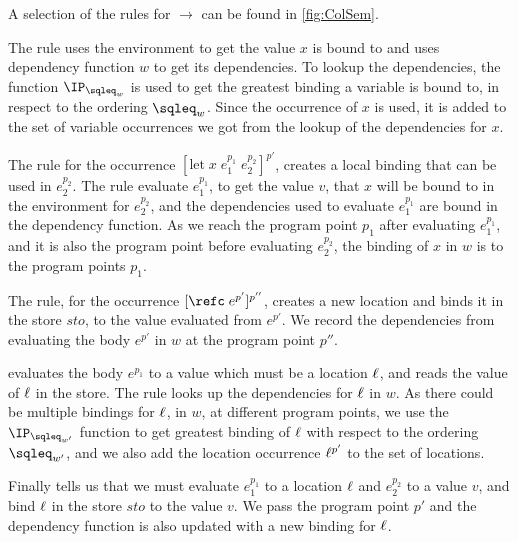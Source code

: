 \documentclass{eptcs}
\begin{document}
A selection of the rules for $\rightarrow$ can be found in
\cref{fig:ColSem}.

The  rule  uses the environment to get the value $x$ is bound to and uses dependency function $w$ to get its dependencies.
		To lookup the dependencies, the function $\IP_{\sqleq_w}$ is used to get the greatest binding a variable is bound to, in respect to the ordering $\sqleq_w$.
		Since the occurrence of $x$ is used, it is added to the set of variable occurrences we got from the lookup of the dependencies for $x$.

The  rule for the occurrence $[\mbox{let}\;x\;e_1^{p_1}\;e_2^{p_2}]^{p'}$, creates a local binding that can be used in $e_2^{p_2}$.
		The  rule evaluate $e_1^{p_1}$, to get the value $v$, that $x$ will be bound to in the environment for $e_2^{p_2}$, and the dependencies used to evaluate $e_1^{p_1}$ are bound in the dependency function.
		As we reach the program point $p_1$ after evaluating $e_1^{p_1}$, and it is also the program point before evaluating $e_2^{p_2}$, the binding of $x$ in $w$ is to the program points $p_1$.	

The  rule, for the occurrence $[\refc\;e^{p'}]^{p''}$,
creates a new location and binds it in the store $sto$, to the value
evaluated from $e^{p'}$. We record the dependencies from evaluating
the body $e^{p'}$ in $w$ at the program point $p''$.

 evaluates the body $e^{p_1}$ to a value which
must be a location $\ell$, and reads the value of $\ell$ in the store.
		The  rule looks up the dependencies for
                $\ell$ in $w$.
		As there could be multiple bindings for $\ell$, in $w$, at different program points, we use the $\IP_{\sqleq_{w'}}$ function to get greatest binding of $\ell$ with respect to the ordering $\sqleq_{w'}$, 
		and we also add the location occurrence $\ell^{p'}$ to the set of locations.

                Finally  tells us that we must
                evaluate $e_1^{p_1}$ to a location $\ell$ and
                $e_2^{p_2}$ to a value $v$, and bind $\ell$ in the
                store $sto$ to the value $v$.  We pass the program
                point $p'$ and the dependency function
                is also updated with a new binding for $\ell$.
\end{document}
